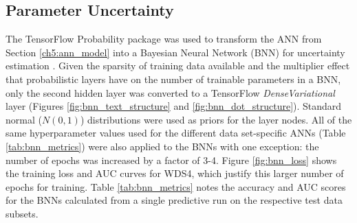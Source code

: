 \subsection{Parameter Uncertainty}\label{ch5:param_uncertainty}
The TensorFlow Probability package was used to transform the ANN from Section \ref{ch5:ann_model} into a Bayesian Neural Network (BNN) for uncertainty estimation \citep{dillon_tensorflow_2017}. Given the sparsity of training data available and the multiplier effect that probabilistic layers have on the number of trainable parameters in a BNN, only the second hidden layer was converted to a TensorFlow \textit{DenseVariational} layer (Figures \ref{fig:bnn_text_structure} and \ref{fig:bnn_dot_structure}). Standard normal ($N(0,1)$) distributions were used as priors for the layer nodes. All of the same hyperparameter values used for the different data set-specific ANNs (Table \ref{tab:bnn_metrics}) were also applied to the BNNs with one exception: the number of epochs was increased by a factor of 3-4. Figure \ref{fig:bnn_loss} shows the training loss and AUC curves for WDS4, which justify this larger number of epochs for training. Table \ref{tab:bnn_metrics} notes the accuracy and AUC scores for the BNNs calculated from a single predictive run on the respective test data subsets.

